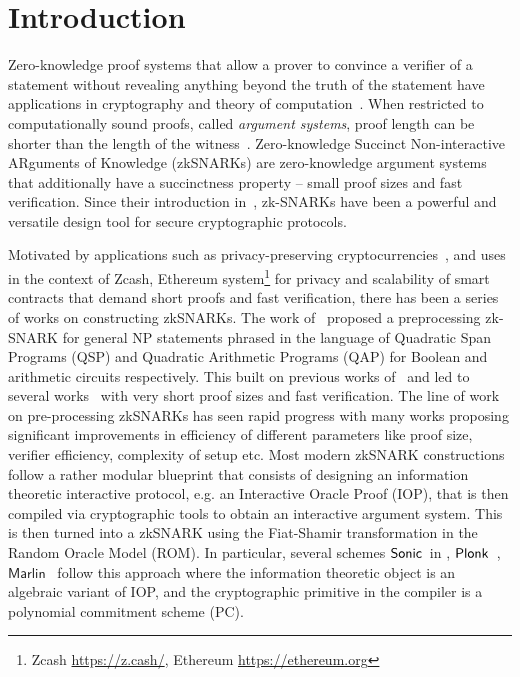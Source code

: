 %
%


\section{Introduction}
Zero-knowledge proof systems that allow a prover to convince a verifier of a statement without revealing anything beyond the truth of the statement have applications in cryptography and theory of computation~\cite{FOCS:GolMicWig86,STOC:Fortnow87,C:BGGHKMR88}. 
When restricted to computationally sound proofs, called \emph{argument systems}, proof length can be shorter than the length of the witness~\cite{brassard1988minimum}. 
Zero-knowledge Succinct Non-interactive ARguments of Knowledge (zkSNARKs) are zero-knowledge argument systems that additionally have a succinctness property -- small proof sizes and fast verification. 
Since their introduction in~\cite{micali1994cs}, zk-SNARKs have been a powerful and versatile design tool for secure cryptographic protocols.

Motivated by applications such as privacy-preserving cryptocurrencies~\cite{SP:BCGGMT14}, and uses in the context of Zcash, Ethereum system\footnote{Zcash \url{https://z.cash/}, Ethereum \url{https://ethereum.org}} for privacy and scalability of smart contracts that demand short proofs and fast verification, there has been a series of works on constructing zkSNARKs. 
The work of~\cite{EC:GGPR13} proposed a preprocessing zk-SNARK for general NP statements phrased in the language of Quadratic Span Programs (QSP) and Quadratic Arithmetic Programs (QAP) for Boolean and arithmetic circuits respectively. This built on previous works of~\cite{IKO07,AC:Groth10a,TCC:Lipmaa12} and led to several works~\cite{TCC:BCIOP13,SP:PHGR13,C:BCGTV13,AC:Lipmaa13,USENIX:BCTV14,EC:Groth16} with very short proof sizes and fast verification. 
The line of work on pre-processing zkSNARKs has seen rapid progress with many works proposing significant improvements in efficiency of different parameters like proof size, verifier efficiency, complexity of setup etc.
Most modern zkSNARK constructions follow a rather modular blueprint that consists of designing an information theoretic interactive protocol, e.g. an Interactive Oracle Proof (IOP), that is then compiled via cryptographic tools to obtain an interactive argument system.  This is then turned into a zkSNARK using the Fiat-Shamir transformation in the Random Oracle Model (ROM). 
In particular, several schemes 
${\textnormal{\textsf{Sonic}}}$~in \cite{CCS:MBKM19}, $\textnormal{\textsf{Plonk}}$~\cite{EPRINT:GabWilCio19}, $\textsf{Marlin}$~\cite{EC:CHMMVW20} 
follow this approach where the information theoretic object is an algebraic variant of IOP, and the cryptographic primitive in the compiler is a polynomial commitment scheme (PC).  

